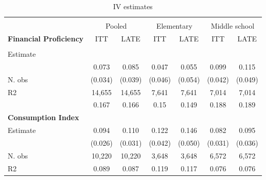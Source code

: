 \begin{table}[ht]
\centering
\begin{threeparttable}
\fontsize{10}{11}\selectfont
\caption{IV estimates}
\begin{tabular}{lcccccc}
\hline
\hline
           &   \multicolumn{ 2}{c}{} &   \multicolumn{ 2}{c}{} &   \multicolumn{ 2}{c}{} \\

           & \multicolumn{ 2}{c}{Pooled} & \multicolumn{ 2}{c}{Elementary} & \multicolumn{ 2}{c}{Middle school} \\
\hline
{\bf Financial Proficiency} &        ITT &       LATE &        ITT &       LATE &        ITT &       LATE \\
           &   \multicolumn{ 2}{c}{} &   \multicolumn{ 2}{c}{} &   \multicolumn{ 2}{c}{} \\

  Estimate &            &            &            &            &            &            \\

           &    0.073 &    0.085 &      0.047 &      0.055 &    0.099 &    0.115 \\

    N. obs &    (0.034) &    (0.039) &    (0.046) &    (0.054) &    (0.042) &    (0.049) \\

        R2 &     14,655 &     14,655 &      7,641 &      7,641 &      7,014 &      7,014 \\

           &      0.167 &      0.166 &       0.15 &      0.149 &      0.188 &      0.189 \\
\hline
{\bf Consumption Index} &            &            &            &            &            &            \\

  Estimate &   0.094 &   0.110 &   0.122 &   0.146 &   0.082 &   0.095 \\

           &    (0.026) &    (0.031) &    (0.042) &    (0.050) &    (0.031) &    (0.036) \\

    N. obs &     10,220 &     10,220 &      3,648 &      3,648 &      6,572 &      6,572 \\

        R2 &      0.089 &      0.087 &      0.119 &      0.117 &      0.076 &      0.076 \\


\end{tabular}
\end{threeparttable}
\end{table}

